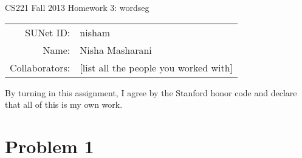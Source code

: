 \documentclass[12pt]{article}
\begin{document}
\begin{center}
{\Large CS221 Fall 2013 Homework 3: wordseg}

\begin{tabular}{rl}
SUNet ID: & nisham \\
Name: & Nisha Masharani \\
Collaborators: & [list all the people you worked with]
\end{tabular}
\end{center}

By turning in this assignment, I agree by the Stanford honor code and declare
that all of this is my own work.

\section*{Problem 1}
\end{document}
